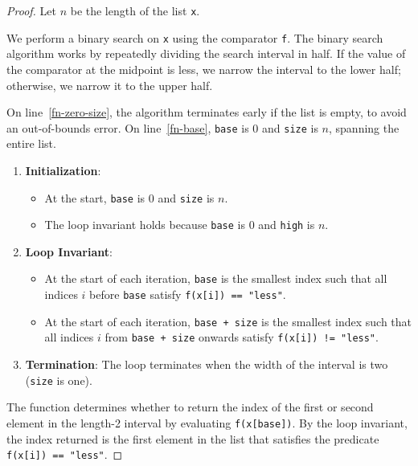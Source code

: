 \documentclass{article}
\begin{document}
\begin{proof}
    Let \( n \) be the length of the list \texttt{x}.

    We perform a binary search on \texttt{x} using the comparator \texttt{f}.
    The binary search algorithm works by repeatedly dividing the search interval in half.
    If the value of the comparator at the midpoint is less, we narrow the interval to the lower half;
    otherwise, we narrow it to the upper half.

    On line~\ref{fn-zero-size}, the algorithm terminates early if the list is empty, to avoid an out-of-bounds error.
    On line~\ref{fn-base}, \texttt{base} is 0 and \texttt{size} is \( n \), spanning the entire list.


    \begin{enumerate}
        \item \textbf{Initialization}:
            \begin{itemize}
                \item At the start, \texttt{base} is 0 and \texttt{size} is \( n \).
                \item The loop invariant holds because \texttt{base} is 0 and \texttt{high} is \( n \).
            \end{itemize}
        \item \textbf{Loop Invariant}:
            \begin{itemize}
                \item At the start of each iteration, \texttt{base} is the smallest index
                such that all indices $i$ before \texttt{base} satisfy \texttt{f(x[i]) == "less"}.
                \item At the start of each iteration, \texttt{base + size} is the smallest index
                such that all indices $i$ from \texttt{base + size} onwards satisfy \texttt{f(x[i]) != "less"}.
            \end{itemize}
        \item \textbf{Termination}:
            The loop terminates when the width of the interval is two (\texttt{size} is one).
    \end{enumerate}

    The function determines whether to return the index of the first or second element in the length-2 interval by evaluating \texttt{f(x[base])}.
    By the loop invariant, the index returned is the first element in the list that satisfies the predicate \texttt{f(x[i]) == "less"}.
\end{proof}
\end{document}
